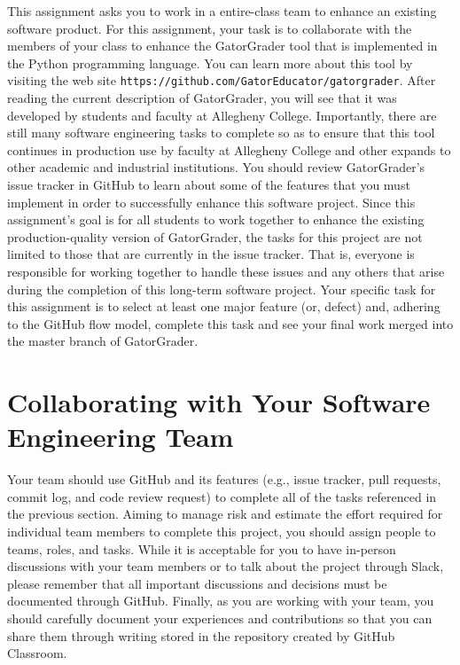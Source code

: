 \documentclass[11pt]{article}
\newcommand{\url}[1]{\lstinline{#1}}
\begin{document}

This assignment asks you to work in a entire-class team to enhance an existing
software product.
%
For this assignment, your task is to collaborate with the members of your class
to enhance the GatorGrader tool that is implemented in the Python programming
language.
%
You can learn more about this tool by visiting the web site
\url{https://github.com/GatorEducator/gatorgrader}. After reading the current
description of GatorGrader, you will see that it was developed by students and
faculty at Allegheny College.
%
Importantly, there are still many software engineering tasks to complete so as
to ensure that this tool continues in production use by faculty at Allegheny
College and other expands to other academic and industrial institutions. You
should review GatorGrader's issue tracker in GitHub to learn about some of the
features that you must implement in order to successfully enhance this software
project. Since this assignment's goal is for all students to work together to
enhance the existing production-quality version of GatorGrader, the tasks for
this project are not limited to those that are currently in the issue tracker.
That is, everyone is responsible for working together to handle these issues and
any others that arise during the completion of this long-term software project.
Your specific task for this assignment is to select at least one major feature
(or, defect) and, adhering to the GitHub flow model, complete this task and see
your final work merged into the master branch of GatorGrader.

\section*{Collaborating with Your Software Engineering Team}

Your team should use GitHub and its features (e.g., issue tracker, pull
requests, commit log, and code review request) to complete all of the tasks
referenced in the previous section.
%
Aiming to manage risk and estimate the effort required for individual team
members to complete this project, you should assign people to teams, roles, and
tasks. While it is acceptable for you to have in-person discussions with your
team members or to talk about the project through Slack, please remember that
all important discussions and decisions must be documented through GitHub.
Finally, as you are working with your team, you should carefully document your
experiences and contributions so that you can share them through writing stored
in the repository created by GitHub Classroom.
\end{document}
